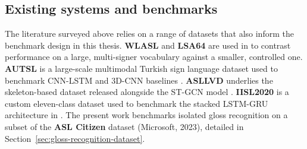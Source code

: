 \subsection{Existing systems and benchmarks}
\label{sec:existing-systems-benchmarks}

The literature surveyed above relies on a range of datasets that also inform the
benchmark design in this thesis. \textbf{WLASL} and \textbf{LSA64} are used in
\cite{bohacek2022spoter} to contrast performance on a large, multi-signer
vocabulary against a smaller, controlled one. \textbf{AUTSL} is a large-scale
multimodal Turkish sign language dataset used to benchmark CNN-LSTM and 3D-CNN
baselines \cite{modalities2022review}. \textbf{ASLLVD} underlies the
skeleton-based dataset released alongside the ST-GCN model
\cite{correia2019stgcn}. \textbf{IISL2020} is a custom eleven-class dataset used
to benchmark the stacked LSTM-GRU architecture in \cite{deepsign2022}. The
present work benchmarks isolated gloss recognition on a subset of the
\textbf{ASL Citizen} dataset (Microsoft, 2023), detailed in
Section~\ref{sec:gloss-recognition-dataset}.

